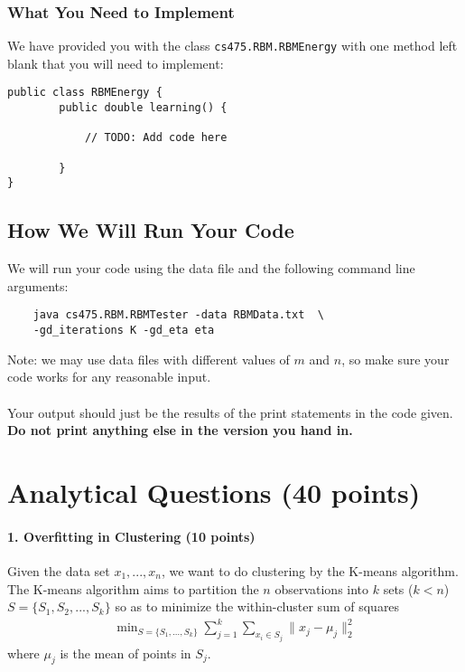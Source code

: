 \documentclass[11pt]{article}
\newcommand{\code}[1]{{\footnotesize \tt #1}}
\begin{document}
\subsubsection{What You Need to Implement} %
We have provided you with the class \code{cs475.RBM.RBMEnergy} with one method left blank that you will need to implement:
\begin{footnotesize}
\begin{verbatim}
public class RBMEnergy {
    	public double learning() {
    		
    		// TODO: Add code here
    		
    	}
}

\end{verbatim}
\end{footnotesize}

\subsection{How We Will Run Your Code} %
We will run your code using the data file and the following command line arguments:
\begin{footnotesize}
\begin{verbatim}
    java cs475.RBM.RBMTester -data RBMData.txt  \
    -gd_iterations K -gd_eta eta
\end{verbatim}
\end{footnotesize}
Note: we may use data files with different values of $m$ and $n$, so make sure your code works for any reasonable input.\\
\\
Your output should just be the results of the print statements in the code given. {\bf Do not print anything else in the version you hand in.}


\section{Analytical Questions (40 points)}

\paragraph{1. Overfitting in Clustering (10 points)}

Given the data set $x_1,...,x_n$, we want to do clustering by the K-means algorithm. The K-means algorithm aims to partition the $n$ observations into $k$ sets ($k < n$) $S = \{S_1, S_2, ... , S_k\}$ so as to minimize the within-cluster sum of squares
\begin{eqnarray*}
\mathop{\textrm{min}}_{S=\{S_1,...,S_k\}}\sum_{j=1}^k\sum_{x_i\in S_j}\|x_j-\mu_j\|_2^2
\end{eqnarray*}
where $\mu_j$ is the mean of points in $S_j$.
\end{document}
